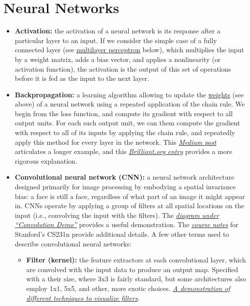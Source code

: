 \section{Neural Networks}
\begin{itemize}
\item \textbf{Activation:\label{tg:activation}} the activation of a neural network is its response after a particular layer to an input. If we consider the simple case of a fully connected layer (see \hyperref[tg:mlp]{multilayer perceptron} below), which multiplies the input by a weight matrix, adds a bias vector, and applies a nonlinearity (or activation function), the activation is the output of this set of operations before it is fed as the input to the next layer.

\item \textbf{Backpropagation:\label{tg:backprop}} a learning algorithm allowing to update the \hyperref[tg:weights]{weights} (see above) of a neural network using a repeated application of the chain rule. We begin from the loss function, and compute its gradient with respect to all output units. For each such output unit, we can them compute the gradient with respect to all of its inputs by applying the chain rule, and repeatedly apply this method for every layer in the network. This \href{https://medium.com/datathings/neural-networks-and-backpropagation-explained-in-a-simple-way-f540a3611f5e}{\emph{Medium post}} articulates a longer example, and this \href{https://brilliant.org/wiki/backpropagation/}{\emph{Brilliant.org entry}} provides a more rigorous explanation.

\item \textbf{Convolutional neural network (CNN):\label{tg:cnn}} a neural network architecture designed primarily for image processing by embodying a spatial invariance bias: a face is still a face, regardless of what part of an image it might appear in. CNNs operate by applying a group of filters at all spatial locations on the input (i.e., convolving the input with the filters). The \href{http://cs231n.github.io/convolutional-networks/\#conv}{\emph{diagram under ``Convolution Demo''}} provides a useful demonstration. The  \href{http://cs231n.github.io/convolutional-networks/\#overview}{\emph{course notes}} for Stanford's CS231n provide additional details. A few other terms used to describe convolutional neural networks:

    \begin{itemize}
    \item \textbf{Filter (kernel):\label{tg:filter}} the feature extractors at each convolutional layer, which are convolved with the input data to produce an output map. Specified with a their size, where 3x3 is fairly standard, but some architectures also employ 1x1, 5x5, and other, more exotic choices. \href{http://cs231n.github.io/understanding-cnn/}{\emph{A demonstration of different techniques to visualize filters}}.
 

\end{itemize}
\end{itemize}
